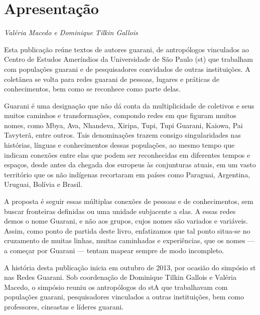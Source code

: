 \chapter{Apresentação}
\begin{flushright}
\emph{Valéria Macedo e Dominique Tilkin Gallois}
\end{flushright}

\medskip
Esta publicação reúne textos de autores guarani, de antropólogos
vinculados ao Centro de Estudos Ameríndios da Universidade de São Paulo
(st) que trabalham com populações guarani e de pesquisadores
convidados de outras instituições. A coletânea se volta para redes
guarani de pessoas, lugares e práticas de conhecimentos, bem como se
reconhece como parte delas. 

Guarani é uma designação que não dá conta da multiplicidade de coletivos
e seus muitos caminhos e transformações, compondo redes em que figuram
muitos nomes, como Mbya, Ava, Nhandeva, Xiripa, Tupi, Tupi Guarani,
Kaiowa, Pai Tavyterã, entre outros. Tais denominações trazem consigo
singularidades nas histórias, línguas e conhecimentos dessas
populações, ao mesmo tempo que indicam conexões entre elas que podem
ser reconhecidas em diferentes tempos e espaços, desde antes da chegada
dos europeus às conjunturas atuais, em um vasto território que os não
indígenas recortaram em países como Paraguai, Argentina, Uruguai,
Bolívia e Brasil.

A proposta é seguir essas múltiplas conexões de pessoas e de
conhecimentos, sem buscar fronteiras definidas ou uma unidade
subjacente a elas. A essas redes demos o nome Guarani, e não aos
grupos, cujos nomes são variados e variáveis. Assim, como ponto de
partida deste livro, enfatizamos que tal ponto situa-se no cruzamento
de muitas linhas, muitas caminhadas e experiências, que os nomes — a
começar por Guarani — tentam mapear sempre de modo incompleto.

A história desta publicação inicia em outubro de 2013, por ocasião do
simpósio st nas Redes Guarani.  Sob coordenação de Dominique Tilkin
Gallois e Valéria Macedo, o simpósio reuniu os antropólogos do stA
que trabalhavam com populações guarani, pesquisadores vinculados a
outras instituições, bem como professores, cineastas e líderes guarani.

